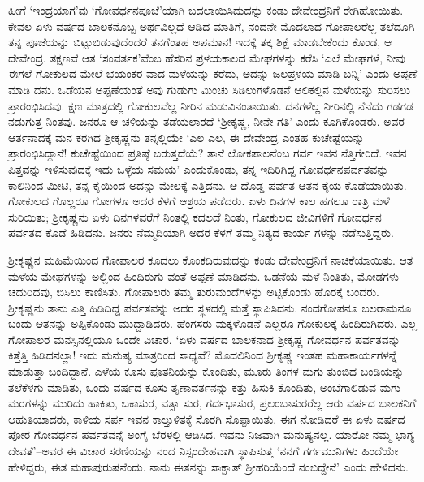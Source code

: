ಹೀಗೆ ‘ಇಂದ್ರಯಾಗ’ವು ‘ಗೋವರ್ಧನಪೂಜೆ’ಯಾಗಿ ಬದಲಾಯಿಸಿದುದನ್ನು ಕಂಡು ದೇವೇಂದ್ರನಿಗೆ ರೇಗಿಹೋಯಿತು. ಕೇವಲ ಏಳು ವರ್ಷದ ಬಾಲಕನೊಬ್ಬ ಅರ್ಥವಿಲ್ಲದೆ ಆಡಿದ ಮಾತಿಗೆ, ನಂದನೇ ಮೊದಲಾದ ಗೋಪಾಲರೆಲ್ಲ ತಲೆದೂಗಿ ತನ್ನ ಪೂಜೆಯನ್ನು ಬಿಟ್ಟುಬಿಡುವುದೆಂದರೆ ತನಗೆಂತಹ ಅಪಮಾನ! ಇದಕ್ಕೆ ತಕ್ಕ ಶಿಕ್ಷೆ ಮಾಡಬೇಕೆಂದು ಕೊಂಡ, ಆ ದೇವೇಂದ್ರ. ತಕ್ಷಣವೆ ಆತ ‘ಸಂವರ್ತಕ’ವೆಂಬ ಹೆಸರಿನ ಪ್ರಳಯಕಾಲದ ಮೇಘಗಳನ್ನು ಕರೆಸಿ ‘ಎಲೆ ಮೇಘಗಳೆ, ನೀವು ಈಗಲೆ ಗೋಕುಲದ ಮೇಲೆ ಭಯಂಕರ ವಾದ ಮಳೆಯನ್ನು ಕರೆದು, ಅದನ್ನು ಜಲಪ್ರಳಯ ಮಾಡಿ ಬನ್ನಿ’ ಎಂದು ಅಪ್ಪಣೆ ಮಾಡಿ ದನು. ಒಡೆಯನ ಅಪ್ಪಣೆಯಂತೆ ಅವು ಗುಡುಗು ಮಿಂಚು ಸಿಡಿಲುಗಳೊಡನೆ ಆಲಿಕಲ್ಲಿನ ಮಳೆಯನ್ನು ಸುರಿಸಲು ಪ್ರಾರಂಭಿಸಿದವು. ಕ್ಷಣ ಮಾತ್ರದಲ್ಲಿ ಗೋಕುಲವೆಲ್ಲ ನೀರಿನ ಮಡುವಿನಂತಾಯಿತು. ದನಗಳೆಲ್ಲ ನೀರಿನಲ್ಲಿ ನೆನೆದು ಗಡಗಡ ನಡುಗುತ್ತ ನಿಂತವು. ಜನರೂ ಆ ಚಳಿಯನ್ನು ತಡೆಯಲಾರದೆ ‘ಶ್ರೀಕೃಷ್ಣ, ನೀನೇ ಗತಿ’ ಎಂದು ಕೂಗಿಕೊಂಡರು. ಅವರ ಆರ್ತನಾದಕ್ಕೆ ಮನ ಕರಗಿದ ಶ್ರೀಕೃಷ್ಣನು ತನ್ನಲ್ಲಿಯೇ ‘ಎಲ ಎಲ, ಈ ದೇವೇಂದ್ರ ಎಂತಹ ಕುಚೇಷ್ಟೆಯನ್ನು ಪ್ರಾರಂಭಿಸಿದ್ದಾನೆ! ಕುಚೇಷ್ಟೆಯಿಂದ ಪ್ರತಿಷ್ಠೆ ಬರುತ್ತದೆಯೆ? ತಾನೆ ಲೋಕಪಾಲನೆಂಬ ಗರ್ವ ಇವನ ನೆತ್ತಿಗೇರಿದೆ. ಇವನ ಪಿತ್ತವನ್ನು ಇಳಿಸುವುದಕ್ಕೆ ಇದು ಒಳ್ಳೆಯ ಸಮಯ’ ಎಂದುಕೊಂಡು, ತನ್ನ ಇದಿರಿಗಿದ್ದ ಗೋವರ್ಧನಪರ್ವತವನ್ನು ಕಾಲಿನಿಂದ ಮೀಟಿ, ತನ್ನ ಕೈಯಿಂದ ಅದನ್ನು ಮೇಲಕ್ಕೆ ಎತ್ತಿದನು. ಆ ದೊಡ್ಡ ಪರ್ವತ ಆತನ ಕೈಯ ಕೊಡೆಯಾಯಿತು. ಗೋಕುಲದ ಗೊಲ್ಲರೂ ಗೋಗಳೂ ಅದರ ಕೆಳಗೆ ಆಶ್ರಯ ಪಡೆದರು. ಏಳು ದಿನಗಳ ಕಾಲ ಹಗಲೂ ರಾತ್ರಿ ಮಳೆ ಸುರಿಯಿತು; ಶ್ರೀಕೃಷ್ಣನು ಏಳು ದಿನಗಳವರೆಗೆ ನಿಂತಲ್ಲಿ ಕದಲದೆ ನಿಂತು, ಗೋಕುಲದ ಜೀವಿಗಳಿಗೆ ಗೋವರ್ಧನ ಪರ್ವತದ ಕೊಡೆ ಹಿಡಿದನು. ಜನರು ನೆಮ್ಮದಿಯಾಗಿ ಅದರ ಕೆಳಗೆ ತಮ್ಮ ನಿತ್ಯದ ಕಾರ್ಯ ಗಳನ್ನು ನಡೆಸುತ್ತಿದ್ದರು.

 ಶ್ರೀಕೃಷ್ಣನ ಮಹಿಮೆಯಿಂದ ಗೋಪಾಲರ ಕೂದಲು ಕೊಂಕದಿರುವುದನ್ನು ಕಂಡು ದೇವೇಂದ್ರನಿಗೆ ನಾಚಿಕೆಯಾಯಿತು. ಆತ ಮಳೆಯ ಮೇಘಗಳನ್ನು ಅಲ್ಲಿಂದ ಹಿಂದಿರುಗು ವಂತೆ ಅಪ್ಪಣೆ ಮಾಡಿದನು. ಒಡನೆಯೆ ಮಳೆ ನಿಂತಿತು, ಮೋಡಗಳು ಚದುರಿದವು, ಬಿಸಿಲು ಕಾಣಿಸಿತು. ಗೋಪಾಲರು ತಮ್ಮ ತುರುಮಂದೆಗಳನ್ನು ಅಟ್ಟಿಕೊಂಡು ಹೊರಕ್ಕೆ ಬಂದರು. ಶ್ರೀಕೃಷ್ಣನು ತಾನು ಎತ್ತಿ ಹಿಡಿದಿದ್ದ ಪರ್ವತವನ್ನು ಅದರ ಸ್ಥಳದಲ್ಲಿ ಮತ್ತೆ ಸ್ಥಾಪಿಸಿದನು. ನಂದಗೋಪನೂ ಬಲರಾಮನೂ ಬಂದು ಆತನನ್ನು ಅಪ್ಪಿಕೊಂಡು ಮುದ್ದಾಡಿದರು. ಹೆಂಗಸರು ಮಕ್ಕಳೊಡನೆ ಎಲ್ಲರೂ ಗೋಕುಲಕ್ಕೆ ಹಿಂದಿರುಗಿದರು. ಎಲ್ಲ ಗೋಪಾಲರ ಮನಸ್ಸಿನಲ್ಲಿಯೂ ಒಂದೇ ವಿಚಾರ. ‘ಏಳು ವರ್ಷದ ಬಾಲಕನಾದ ಶ್ರೀಕೃಷ್ಣ ಗೋವರ್ಧನ ಪರ್ವತವನ್ನು ಕಿತ್ತೆತ್ತಿ ಹಿಡಿದನಲ್ಲಾ! ಇದು ಮನುಷ್ಯ ಮಾತ್ರರಿಂದ ಸಾಧ್ಯವೆ? ಮೊದಲಿನಿಂದ ಶ್ರೀಕೃಷ್ಣ ಇಂತಹ ಮಹಾಕಾರ್ಯಗಳನ್ನೆ ಮಾಡುತ್ತಾ ಬಂದಿದ್ದಾನೆ. ಎಳೆಯ ಕೂಸು ಪೂತನಿಯನ್ನು ಕೊಂದಿತು, ಮೂರು ತಿಂಗಳ ಮಗು ತುಂಬಿದ ಬಂಡಿಯನ್ನು ತಲೆಕೆಳಗು ಮಾಡಿತು, ಒಂದು ವರ್ಷದ ಕೂಸು ತೃಣಾವರ್ತನನ್ನು ಕತ್ತು ಹಿಸುಕಿ ಕೊಂದಿತು, ಅಂಬೆಗಾಲಿಡುವ ಮಗು ಮರಗಳನ್ನು ಮುರಿದು ಹಾಕಿತು, ಬಕಾಸುರ, ವತ್ಸಾ ಸುರ, ಗರ್ದಭಾಸುರ, ಪ್ರಲಂಬಾಸುರರೆಲ್ಲ ಆರು ವರ್ಷದ ಬಾಲಕನಿಗೆ ಆಹುತಿಯಾದರು, ಕಾಳಿಯ ಸರ್ಪ ಇವನ ಕಾಲ್ತುಳಿತಕ್ಕೆ ಸೊರಗಿ ಸೊಪ್ಪಾಯಿತು. ಈಗ ನೋಡಿದರೆ ಈ ಏಳು ವರ್ಷದ ಪೋರ ಗೋವರ್ಧನ ಪರ್ವತವನ್ನೆ ಅಂಗೈ ಬೆರಳಲ್ಲಿ ಆಡಿಸಿದ. ಇವನು ನಿಜವಾಗಿ ಮನುಷ್ಯನಲ್ಲ. ಯಾರೋ ನಮ್ಮ ಭಾಗ್ಯ ದೇವತೆ’–ಅವರ ಈ ವಿಚಾರ ಸರಣಿಯನ್ನು ನಂದ ನಿಸ್ಸಂದೇಹವಾಗಿ ಸ್ಥಾಪಿಸುತ್ತ ‘ನನಗೆ ಗರ್ಗಮುನಿಗಳು ಹಿಂದೆಯೇ ಹೇಳಿದ್ದರು, ಈತ ಮಹಾಪುರುಷನೆಂದು. ನಾನು ಈತನನ್ನು ಸಾಕ್ಷಾತ್ ಶ್ರೀಹರಿಯೆಂದೆ ನಂಬಿದ್ದೇನೆ’ ಎಂದು ಹೇಳಿದನು.

